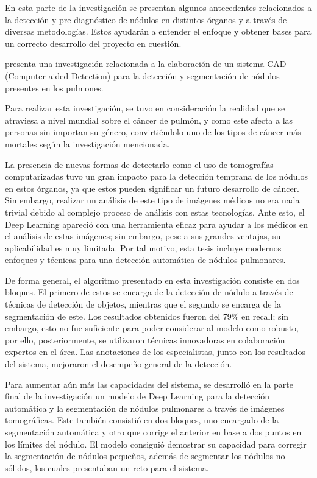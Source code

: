 En esta parte de la investigación se presentan algunos antecedentes relacionados a la detección y pre-diagnóstico de nódulos en distintos órganos y a través de diversas metodologías. Estos ayudarán a entender el enfoque y obtener bases para un correcto desarrollo del proyecto en cuestión.

\cite{pr_moreira2021deteclung} presenta una investigación relacionada a la elaboración de un sistema CAD (Computer-aided Detection) para la detección y segmentación de nódulos presentes en los pulmones.

Para realizar esta investigación, se tuvo en consideración la realidad que se atraviesa a nivel mundial sobre el cáncer de pulmón, y como este afecta a las personas sin importan su género, convirtiéndolo uno de los tipos de cáncer más mortales según la investigación mencionada. 

La presencia de nuevas formas de detectarlo como el uso de tomografías computarizadas tuvo un gran impacto para la detección temprana de los nódulos en estos órganos, ya que estos pueden significar un futuro desarrollo de cáncer. Sin embargo, realizar un análisis de este tipo de imágenes médicos no era nada trivial debido al complejo proceso de análisis con estas tecnologías. Ante esto, el Deep Learning apareció con una herramienta eficaz para ayudar a los médicos en el análisis de estas imágenes; sin embargo, pese a sus grandes ventajas, su aplicabilidad es muy limitada. Por tal motivo, esta tesis incluye modernos enfoques y técnicas para una detección automática de nódulos pulmonares.

De forma general, el algoritmo presentado en esta investigación consiste en dos bloques. El primero de estos se encarga de la detección de nódulo a través de técnicas de detección de objetos, mientras que el segundo se encarga de la segmentación de este. Los resultados obtenidos fueron del 79\% en recall; sin embargo, esto no fue suficiente para poder considerar al modelo como robusto, por ello, posteriormente, se utilizaron técnicas innovadoras en colaboración expertos en el área. Las anotaciones de los especialistas, junto con los resultados del sistema, mejoraron el desempeño general de la detección.

Para aumentar aún más las capacidades del sistema, se desarrolló en la parte final de la investigación un modelo de Deep Learning para la detección automática y la segmentación de nódulos pulmonares a través de imágenes tomográficas. Este también consistió en dos bloques, uno encargado de la segmentación automática y otro que corrige el anterior en base a dos puntos en los límites del nódulo. El modelo consiguió demostrar su capacidad para corregir la segmentación de nódulos pequeños, además de segmentar los nódulos no sólidos, los cuales presentaban un reto para el sistema.

